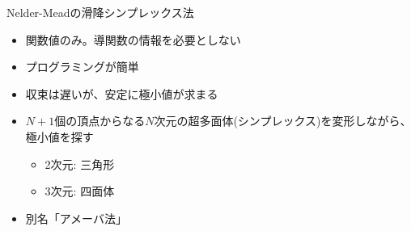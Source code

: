 \begin{frame}[t,fragile]{Nelder-Meadの滑降シンプレックス法}
  \begin{itemize}
  \item 関数値のみ。導関数の情報を必要としない
  \item プログラミングが簡単
  \item 収束は遅いが、安定に極小値が求まる
  \item $N+1$個の頂点からなる$N$次元の超多面体(シンプレックス)を変形しながら、極小値を探す
    \begin{itemize}
    \item 2次元: 三角形
    \item 3次元: 四面体
    \end{itemize}
  \item 別名「アメーバ法」
  \end{itemize}
\end{frame}
